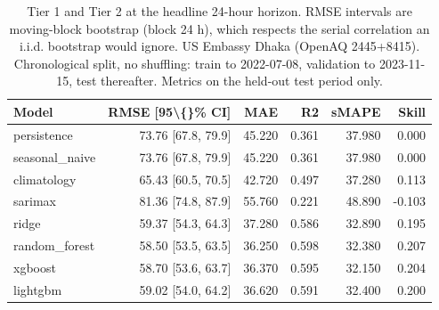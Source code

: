 \begin{table}[htbp]
\caption{Tier 1 and Tier 2 at the headline 24-hour horizon. RMSE intervals are moving-block bootstrap (block 24 h), which respects the serial correlation an i.i.d. bootstrap would ignore. US Embassy Dhaka (OpenAQ 2445+8415). Chronological split, no shuffling: train to 2022-07-08, validation to 2023-11-15, test thereafter. Metrics on the held-out test period only.}
\label{tab:tier1_tier2_h24}
\begin{tabular}{lrrrrr}
\toprule
Model & RMSE [95\textbackslash\{\}\% CI] & MAE & R2 & sMAPE & Skill \\
\midrule
persistence & 73.76 [67.8, 79.9] & 45.220 & 0.361 & 37.980 & 0.000 \\
seasonal\_naive & 73.76 [67.8, 79.9] & 45.220 & 0.361 & 37.980 & 0.000 \\
climatology & 65.43 [60.5, 70.5] & 42.720 & 0.497 & 37.280 & 0.113 \\
sarimax & 81.36 [74.8, 87.9] & 55.760 & 0.221 & 48.890 & -0.103 \\
ridge & 59.37 [54.3, 64.3] & 37.280 & 0.586 & 32.890 & 0.195 \\
random\_forest & 58.50 [53.5, 63.5] & 36.250 & 0.598 & 32.380 & 0.207 \\
xgboost & 58.70 [53.6, 63.7] & 36.370 & 0.595 & 32.150 & 0.204 \\
lightgbm & 59.02 [54.0, 64.2] & 36.620 & 0.591 & 32.400 & 0.200 \\
\bottomrule
\end{tabular}
\end{table}
